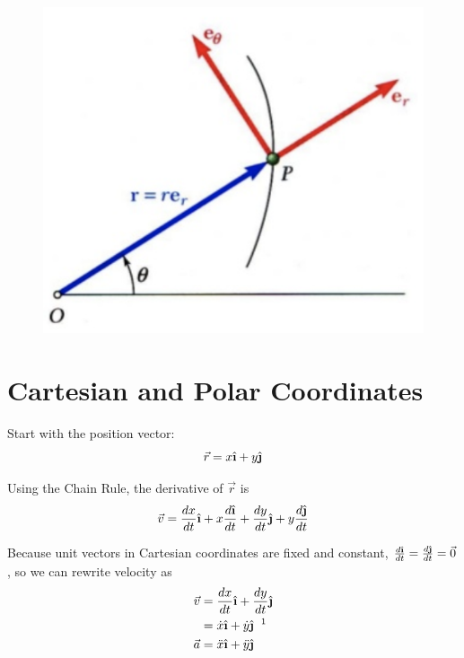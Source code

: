 \documentclass{article}
\newcommand{\ihat}{\hat{\textbf{\i}}}
\newcommand{\jhat}{\hat{\textbf{\j}}}
\begin{document}
\addtocounter{footnote}{-1}
 

\begin{figure}[h]
    \includegraphics[scale=0.7]{img1}
    \centering
\end{figure}

\clearpage


\section*{Cartesian and Polar Coordinates}

Start with the position vector:
$$\vec{r} = x\ihat + y\jhat$$

Using the Chain Rule, the derivative of $\vec{r}$ is
$$\vec{v} = \frac{dx}{dt}\ihat + x\frac{d\ihat}{dt} + \frac{dy}{dt}\jhat + y\frac{d\jhat}{dt}$$

Because unit vectors in Cartesian coordinates are fixed and constant, $\frac{d\ihat}{dt} = \frac{d\jhat}{dt} = \vec{0}$, so we can rewrite velocity as
\begin{align*}
    \vec{v} &= \frac{dx}{dt}\ihat + \frac{dy}{dt}\jhat \\
            &= \dot{x}\ihat + \dot{y}\jhat \hspace{0.2cm} \text{\footnotemark} \\
    \vec{a} &= \ddot{x}\ihat + \ddot{y}\jhat
\end{align*}
\end{document}
